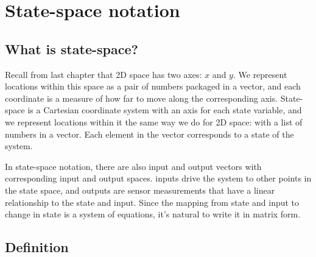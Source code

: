 \section{State-space notation}

\subsection{What is state-space?}

Recall from last chapter that 2D space has two axes: $x$ and $y$. We represent
locations within this space as a pair of numbers packaged in a vector, and each
coordinate is a measure of how far to move along the corresponding axis.
State-space is a Cartesian coordinate system with an axis for each \gls{state}
variable, and we represent locations within it the same way we do for 2D space:
with a list of numbers in a vector. Each element in the vector corresponds to a
\gls{state} of the \gls{system}.

In state-space notation, there are also \gls{input} and \gls{output} vectors
with corresponding \gls{input} and \gls{output} spaces. \Glspl{input} drive the
\gls{system} to other points in the state space, and \glspl{output} are sensor
measurements that have a linear relationship to the \gls{state} and \gls{input}.
Since the mapping from \gls{state} and \gls{input} to change in \gls{state} is a
system of equations, it's natural to write it in matrix form.

\subsection{Definition}

